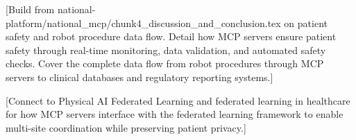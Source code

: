 [Build from national-platform/national\_mcp/chunk4\_discussion\_and\_conclusion.tex
on patient safety and robot procedure data flow. Detail how MCP servers ensure
patient safety through real-time monitoring, data validation, and automated
safety checks. Cover the complete data flow from robot procedures through
MCP servers to clinical databases and regulatory reporting systems.]

[Connect to Physical AI Federated Learning \cite{fl-paper} and federated
learning in healthcare \cite{federated-learning-healthcare} for how MCP
servers interface with the federated learning framework to enable multi-site
coordination while preserving patient privacy.]
